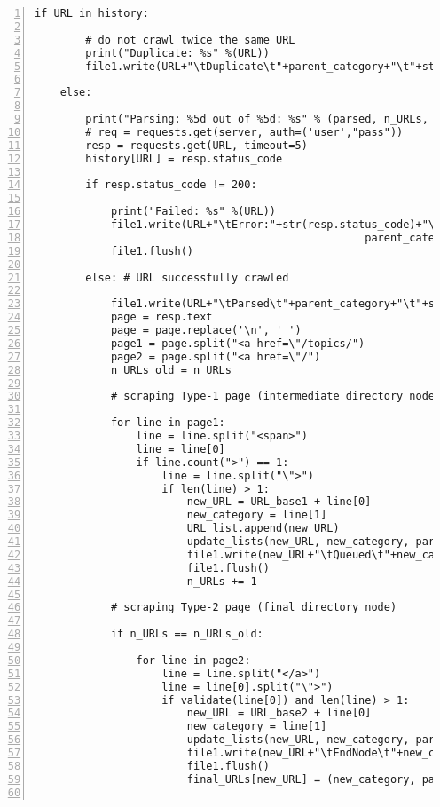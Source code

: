 \documentclass[oneside,10pt]{book}
\begin{document}
\begin{lstlisting}[numbers=left]
    if URL in history:

        # do not crawl twice the same URL
        print("Duplicate: %s" %(URL)) 
        file1.write(URL+"\tDuplicate\t"+parent_category+"\t"+str(level)+"\n")

    else:   

        print("Parsing: %5d out of %5d: %s" % (parsed, n_URLs, URL))
        # req = requests.get(server, auth=('user',"pass"))
        resp = requests.get(URL, timeout=5)
        history[URL] = resp.status_code

        if resp.status_code != 200:

            print("Failed: %s" %(URL)) 
            file1.write(URL+"\tError:"+str(resp.status_code)+"\t"+
                                                    parent_category+"\t"+str(level)+"\n")
            file1.flush()

        else: # URL successfully crawled

            file1.write(URL+"\tParsed\t"+parent_category+"\t"+str(level)+"\n")
            page = resp.text
            page = page.replace('\n', ' ')
            page1 = page.split("<a href=\"/topics/")
            page2 = page.split("<a href=\"/")
            n_URLs_old = n_URLs

            # scraping Type-1 page (intermediate directory node) 

            for line in page1:  
                line = line.split("<span>")
                line = line[0]
                if line.count(">") == 1:
                    line = line.split("\">")
                    if len(line) > 1:
                        new_URL = URL_base1 + line[0]
                        new_category = line[1]  
                        URL_list.append(new_URL)
                        update_lists(new_URL, new_category, parent_category, file2)
                        file1.write(new_URL+"\tQueued\t"+new_category+"\t"+str(level+1)+"\n")
                        file1.flush()
                        n_URLs += 1

            # scraping Type-2 page (final directory node)

            if n_URLs == n_URLs_old:

                for line in page2:
                    line = line.split("</a>") 
                    line = line[0].split("\">")
                    if validate(line[0]) and len(line) > 1:
                        new_URL = URL_base2 + line[0]
                        new_category = line[1] 
                        update_lists(new_URL, new_category, parent_category, file2)
                        file1.write(new_URL+"\tEndNode\t"+new_category+"\t"+str(level+1)+"\n")
                        file1.flush()
                        final_URLs[new_URL] = (new_category, parent_category, level+1)


\end{lstlisting}
\end{document}
